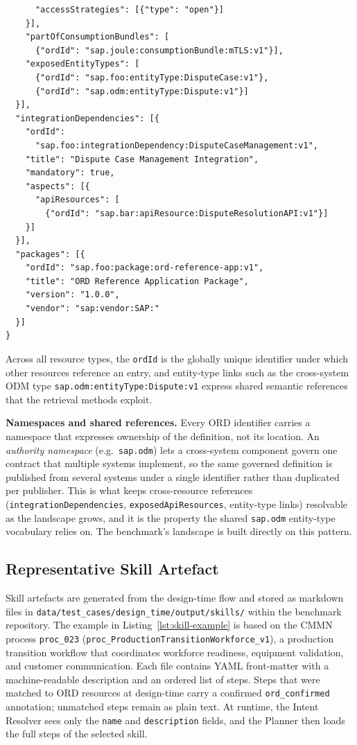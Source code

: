 \begin{lstlisting}
      "accessStrategies": [{"type": "open"}]
    }],
    "partOfConsumptionBundles": [
      {"ordId": "sap.joule:consumptionBundle:mTLS:v1"}],
    "exposedEntityTypes": [
      {"ordId": "sap.foo:entityType:DisputeCase:v1"},
      {"ordId": "sap.odm:entityType:Dispute:v1"}]
  }],
  "integrationDependencies": [{
    "ordId":
      "sap.foo:integrationDependency:DisputeCaseManagement:v1",
    "title": "Dispute Case Management Integration",
    "mandatory": true,
    "aspects": [{
      "apiResources": [
        {"ordId": "sap.bar:apiResource:DisputeResolutionAPI:v1"}]
    }]
  }],
  "packages": [{
    "ordId": "sap.foo:package:ord-reference-app:v1",
    "title": "ORD Reference Application Package",
    "version": "1.0.0",
    "vendor": "sap:vendor:SAP:"
  }]
}
\end{lstlisting}

Across all resource types, the \texttt{ordId} is the globally unique identifier under which other resources reference an entry, and entity-type links such as the cross-system ODM type \texttt{sap.odm:entityType:Dispute:v1} express shared semantic references that the retrieval methods exploit.

\textbf{Namespaces and shared references.} Every ORD identifier carries a namespace that expresses ownership of the definition, not its location. An \emph{authority namespace} (e.g.\ \texttt{sap.odm}) lets a cross-system component govern one contract that multiple systems implement, so the same governed definition is published from several systems under a single identifier rather than duplicated per publisher. This is what keeps cross-resource references (\texttt{integrationDependencies}, \texttt{exposedApiResources}, entity-type links) resolvable as the landscape grows, and it is the property the shared \texttt{sap.odm} entity-type vocabulary relies on. The benchmark's landscape is built directly on this pattern.


\subsection{Representative Skill Artefact}
\label{appendix:skill-example}

Skill artefacts are generated from the design-time flow and stored as markdown files in \texttt{data/test\_cases/design\_time/output/skills/} within the benchmark repository. The example in Listing~\ref{lst:skill-example} is based on the CMMN process \texttt{proc\_023} (\texttt{proc\_ProductionTransitionWorkforce\_v1}), a production transition workflow that coordinates workforce readiness, equipment validation, and customer communication. Each file contains YAML front-matter with a machine-readable description and an ordered list of steps. Steps that were matched to ORD resources at design-time carry a confirmed \texttt{ord\_confirmed} annotation; unmatched steps remain as plain text. At runtime, the Intent Resolver sees only the \texttt{name} and \texttt{description} fields, and the Planner then loads the full steps of the selected skill.

